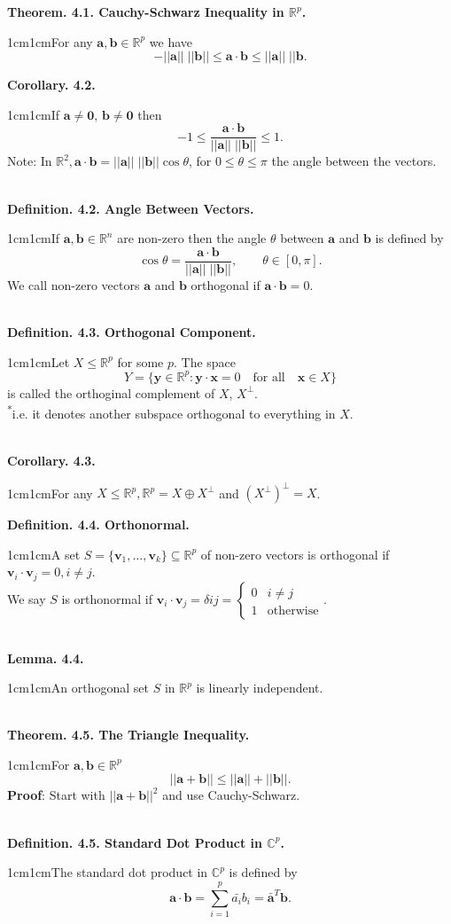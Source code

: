 \documentclass{article}
\newcommand{\vect}[1]{\mathbf{#1}}
\newcommand{\definition}[2]{\textbf{Definition. #1.}\begin{adjustwidth}{1cm}{1cm}#2\end{adjustwidth}}
\newcommand{\theorem}[2]{\textbf{Theorem. #1.}\begin{adjustwidth}{1cm}{1cm}#2\end{adjustwidth}}
\newcommand{\lemma}[2]{\textbf{Lemma. #1.}\begin{adjustwidth}{1cm}{1cm}#2\end{adjustwidth}}
\newcommand{\corollary}[2]{\textbf{Corollary. #1.}\begin{adjustwidth}{1cm}{1cm}#2\end{adjustwidth}}
\begin{document}
\theorem{4.1. Cauchy-Schwarz Inequality in $\mathbb{R}^p$}{For any $\vect{a}, \vect{b} \in \mathbb{R}^p$ we have \[- ||\vect{a}|| \; || \vect{b} || \leq \vect{a} \cdot \vect{b} \leq || \vect{a}|| \; ||\vect{b}.\]}
\corollary{4.2}{If $\vect{a} \neq \vect{0}$, $\vect{b} \neq \vect{0}$ then \[-1 \leq \frac{\vect{a} \cdot \vect{b}}{||\vect{a}|| \; || \vect{b}||} \leq 1.\]Note: In $\mathbb{R}^2, \vect{a} \cdot \vect{b} = || \vect{a} || \; || \vect{b} || \cos{\theta}$, for $0 \leq \theta \leq \pi$ the angle between the vectors.}~\\
\definition{4.2. Angle Between Vectors}{If $\vect{a}, \vect{b} \in \mathbb{R}^n$ are non-zero then the angle $\theta$ between $\vect{a}$ and $\vect{b}$ is defined by \[ \cos \theta = \frac{\vect{a} \cdot \vect{b}}{||\vect{a}|| \; || \vect{b}||}, \qquad \theta \in [0, \pi].\]We call non-zero vectors $\vect{a}$ and $\vect{b}$ orthogonal if $\vect{a} \cdot \vect{b} = 0$.}~\\
\definition{4.3. Orthogonal Component}{Let $X \leq \mathbb{R}^p$ for some $p$. The space \[Y = \{ \vect{y} \in \mathbb{R}^p : \vect{y} \cdot \vect{x} = 0 \quad \text{for all} \quad \vect{x} \in X \}\]is called the orthoginal complement of $X$, $X^{\perp}$.\\[1\baselineskip]\textsuperscript{*}i.e. it denotes another subspace orthogonal to everything in $X$.}~\\
\corollary{4.3}{For any $X \leq \mathbb{R}^p, \mathbb{R}^p = X \oplus X^\perp$ and $(X^\perp)^\perp = X$.}\newpage
\definition{4.4. Orthonormal}{A set $S = \{ \vect{v}_1, \ldots, \vect{v}_k \} \subseteq \mathbb{R}^p$ of non-zero vectors is orthogonal if $\vect{v}_i \cdot \vect{v}_j = 0, i \neq j$.\\We say $S$ is orthonormal if $\vect{v}_i \cdot \vect{v}_j = \delta{ij} = \begin{cases}
  0 & i \neq j\\
  1 & \text{otherwise}
\end{cases}$.}~\\
\lemma{4.4}{An orthogonal set $S$ in $\mathbb{R}^p$ is linearly independent.}~\\
\theorem{4.5. The Triangle Inequality}{For $\vect{a}, \vect{b} \in \mathbb{R}^p$ \[|| \vect{a} + \vect{b} || \leq ||\vect{a}|| + || \vect{b} ||.\]\textbf{Proof}: Start with $|| \vect{a} + \vect{b}||^2$ and use Cauchy-Schwarz.}~\\
\definition{4.5. Standard Dot Product in $\mathbb{C}^p$}{The standard dot product in $\mathbb{C}^p$ is defined by \[\vect{a} \cdot \vect{b} = \sum_{i=1}^p \bar{a_i}b_i = \bar{\vect{a}}^T \vect{b}.\]}~\\
\end{document}
